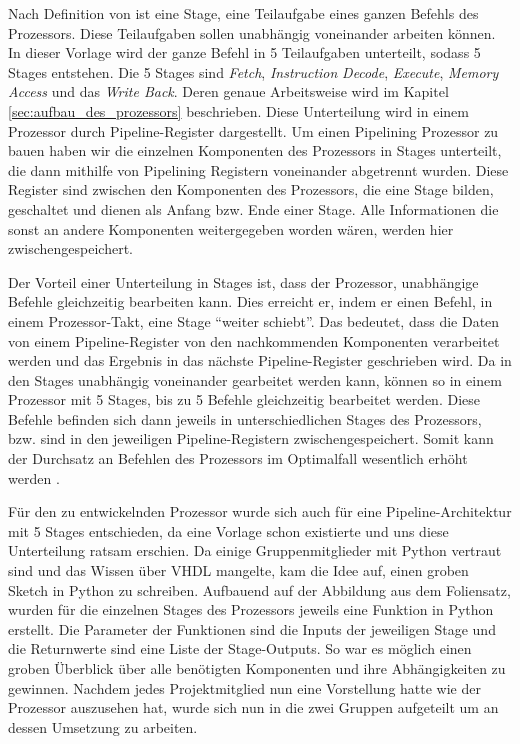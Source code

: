\documentclass[paper=a4,fontsize=12pt,twocolumn]{scrreprt}
\begin{document}
Nach Definition von \textcite{tanenbaum2006computerarchitektur} ist eine Stage, eine Teilaufgabe eines ganzen Befehls des Prozessors.
Diese Teilaufgaben sollen unabhängig voneinander arbeiten können.
In dieser Vorlage wird der ganze Befehl in 5 Teilaufgaben unterteilt, sodass 5 Stages entstehen.
Die 5 Stages sind \textit{Fetch}, \textit{Instruction} \textit{Decode}, \textit{Execute}, \textit{Memory Access} und das \textit{Write Back}.
Deren genaue Arbeitsweise wird im Kapitel \ref{sec:aufbau_des_prozessors} beschrieben.
Diese Unterteilung wird in einem Prozessor durch Pipeline-Register dargestellt.
Um einen Pipelining Prozessor zu bauen haben wir die einzelnen Komponenten des Prozessors in Stages unterteilt, die dann mithilfe von Pipelining Registern voneinander abgetrennt wurden.
Diese Register sind zwischen den Komponenten des Prozessors, die eine Stage bilden, geschaltet und dienen als Anfang bzw. Ende einer Stage.
Alle Informationen die sonst an andere Komponenten weitergegeben worden wären, werden hier zwischengespeichert.

Der Vorteil einer Unterteilung in Stages ist, dass der Prozessor, unabhängige Befehle gleichzeitig bearbeiten kann.
Dies erreicht er, indem er einen Befehl, in einem Prozessor-Takt, eine Stage \enquote{weiter schiebt}.
Das bedeutet, dass die Daten von einem Pipeline-Register von den nachkommenden Komponenten verarbeitet werden und das Ergebnis in das nächste Pipeline-Register geschrieben wird.
Da in den Stages unabhängig voneinander gearbeitet werden kann, können so in einem Prozessor mit 5 Stages, bis zu 5 Befehle gleichzeitig bearbeitet werden.
Diese Befehle befinden sich dann jeweils in unterschiedlichen Stages des Prozessors, bzw. sind in den jeweiligen Pipeline-Registern zwischengespeichert.
Somit kann der Durchsatz an Befehlen des Prozessors im Optimalfall wesentlich erhöht werden \autocite[]{rsvorlesung}.


Für den zu entwickelnden Prozessor wurde sich auch für eine Pipeline-Architektur mit 5 Stages entschieden, da eine Vorlage schon existierte und uns diese Unterteilung ratsam erschien.
Da einige Gruppenmitglieder mit Python vertraut sind und das Wissen über VHDL mangelte, kam die Idee auf, einen groben Sketch in Python zu schreiben.
Aufbauend auf der Abbildung aus dem Foliensatz, wurden für die einzelnen Stages des Prozessors jeweils eine Funktion in Python erstellt.
Die Parameter der Funktionen sind die Inputs der jeweiligen Stage und die Returnwerte sind eine Liste der Stage-Outputs.
So war es möglich einen groben Überblick über alle benötigten Komponenten und ihre Abhängigkeiten zu gewinnen.
Nachdem jedes Projektmitglied nun eine Vorstellung hatte wie der Prozessor auszusehen hat, wurde sich nun in die zwei Gruppen aufgeteilt um an dessen Umsetzung zu arbeiten.
\end{document}
